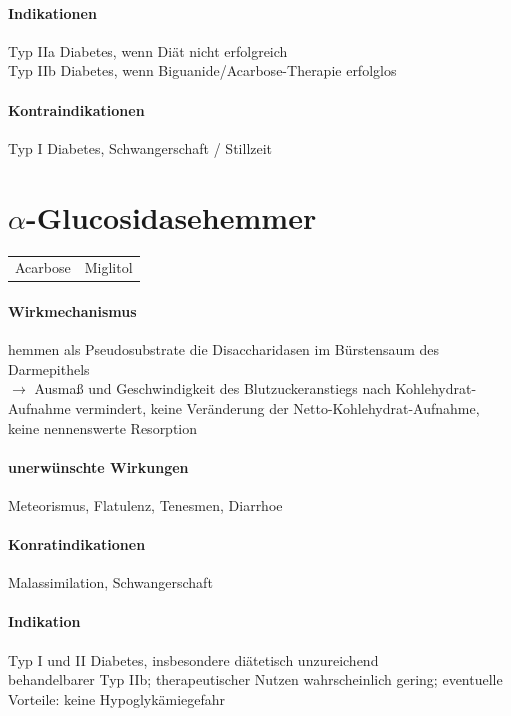 \documentclass[10pt,a4paper]{report}
\begin{document}
\paragraph{Indikationen} %
\label{subp:indikationen}
Typ IIa Diabetes, wenn Diät nicht erfolgreich\\
Typ IIb Diabetes, wenn Biguanide/Acarbose-Therapie erfolglos
\paragraph{Kontraindikationen} %
\label{subp:kontraindikationen}
 Typ I Diabetes, Schwangerschaft / Stillzeit
\section{$\alpha$-Glucosidasehemmer} %
\label{sec:_glucosidasehemmer}
\begin{tabularx}{\textwidth}{XX}
Acarbose&Miglitol\\
\end{tabularx}
\paragraph{Wirkmechanismus} %
\label{subp:wirkmechanismus}
hemmen als Pseudosubstrate die Disaccharidasen 
im Bürstensaum des Darmepithels\\
$\rightarrow$ 	Ausmaß und Geschwindigkeit des Blutzuckeranstiegs nach Kohlehydrat-Aufnahme vermindert, keine Veränderung der Netto-Kohlehydrat-Aufnahme, keine nennenswerte Resorption
\paragraph{unerwünschte Wirkungen} %
\label{subp:unerw_nschte_wirkungen}
Meteorismus, Flatulenz, Tenesmen, Diarrhoe
\paragraph{Konratindikationen} %
\label{subp:konratindikationen}
Malassimilation, Schwangerschaft
\paragraph{Indikation} %
\label{subp:indikation}
Typ I und II Diabetes, insbesondere diätetisch unzureichend\\
behandelbarer Typ IIb; therapeutischer Nutzen wahrscheinlich gering; eventuelle Vorteile: keine Hypoglykämiegefahr
\end{document}
